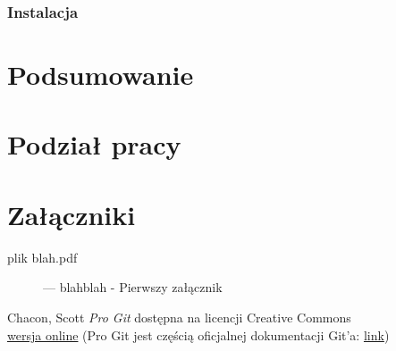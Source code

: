 \documentclass[a4paper,12pt,notitlepage]{mwrep}
\begin{document}
\subsection{Instalacja}

\chapter{Podsumowanie}

\chapter{Podział pracy}

\addtocounter{page}{-1}

\appendix
\chapter*{Załączniki}
\begin{description}
	\item[plik blah.pdf]	 --- blahblah - Pierwszy załącznik
\end{description}

\begin{thebibliography}{9}

	Chacon, Scott
	\emph{Pro Git} dostępna na licencji Creative Commons \\
	\href{http://git-scm.com/book}{wersja online} (Pro Git jest częścią oficjalnej dokumentacji Git'a: \href{http://git-scm.com/documentation}{link})

\end{thebibliography}


\listoffigures

\listoftables

\label{LastPage}
\end{document}
